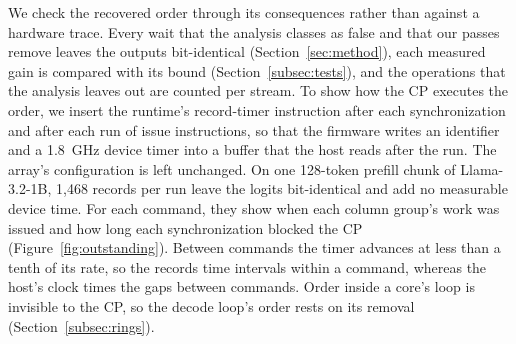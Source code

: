 We check the recovered order through its consequences rather than against a hardware trace.
Every wait that the analysis classes as false and that our passes remove leaves the outputs bit-identical (Section~\ref{sec:method}), each measured gain is compared with its bound (Section~\ref{subsec:tests}), and the operations that the analysis leaves out are counted per stream.
To show how the CP executes the order, we insert the runtime's record-timer instruction after each synchronization and after each run of issue instructions, so that the firmware writes an identifier and a 1.8~GHz device timer into a buffer that the host reads after the run.
The array's configuration is left unchanged.
On one 128-token prefill chunk of Llama-3.2-1B, 1{,}468 records per run leave the logits bit-identical and add no measurable device time.
For each command, they show when each column group's work was issued and how long each synchronization blocked the CP (Figure~\ref{fig:outstanding}).
Between commands the timer advances at less than a tenth of its rate, so the records time intervals within a command, whereas the host's clock times the gaps between commands.
Order inside a core's loop is invisible to the CP, so the decode loop's order rests on its removal (Section~\ref{subsec:rings}).

